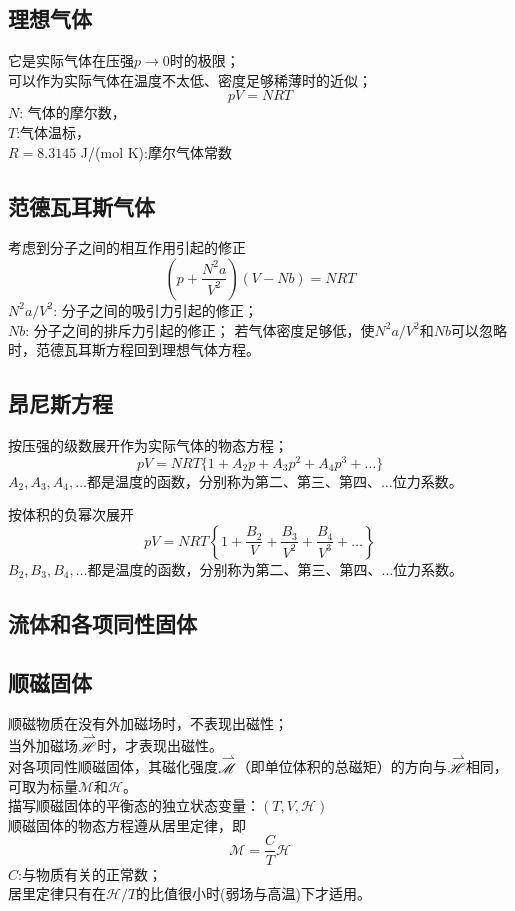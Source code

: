 \documentclass[12pt,a4paper]{article}
\newcommand{\myvec}[1]%
   {\stackrel{\raisebox{-2pt}[0pt][0pt]{\small$\rightharpoonup$}}{#1}}  %
\begin{document}
\subsection{理想气体}
它是实际气体在压强$p\rightarrow 0$时的极限；\\
可以作为实际气体在温度不太低、密度足够稀薄时的近似；
\begin{equation}
pV = NRT
\end{equation}
$N$: 气体的摩尔数，\\
$T$:气体温标，\\
$R = 8.3145$ J/(mol  K):摩尔气体常数

\subsection{范德瓦耳斯气体}
考虑到分子之间的相互作用引起的修正
\begin{equation}
\left( p+\frac{N^2 a}{V^2} \right) (V -Nb) = NRT
\end{equation}
$N^2 a/V^2$: 分子之间的吸引力引起的修正；\\
$Nb$: 分子之间的排斥力引起的修正；
若气体密度足够低，使$N^2 a/V^2$和$Nb$可以忽略时，范德瓦耳斯方程回到理想气体方程。

\subsection{昂尼斯方程}
按压强的级数展开作为实际气体的物态方程；
\begin{equation}
pV = NRT\{1 +A_2 p + A_3 p^2 +A_4 p^3 + \dots  \}
\end{equation}
$A_2, A_3, A_4, \dots$都是温度的函数，分别称为第二、第三、第四、$\dots$位力系数。

按体积的负幂次展开
\begin{equation}
pV = NRT\left \{1 +\frac{B_2}{V} + \frac{B_3}{V^2} +\frac{B_4}{V^3} + \dots \right \}
\end{equation}
$B_2, B_3, B_4, \dots$都是温度的函数，分别称为第二、第三、第四、$\dots$位力系数。

\subsection{流体和各项同性固体}


\subsection{顺磁固体}
顺磁物质在没有外加磁场时，不表现出磁性；\\
当外加磁场$\myvec{\mathscr{H}}$时，才表现出磁性。 \\
对各项同性顺磁固体，其磁化强度$\myvec{\mathscr{M}}$（即单位体积的总磁矩）的方向与$\myvec{\mathscr{H}}$相同，可取为标量$\mathscr{M}$和$\mathscr{H}$。\\
描写顺磁固体的平衡态的独立状态变量：$(T, V,  \mathscr{H})$ \\
顺磁固体的物态方程遵从居里定律，即
\begin{equation}
\mathscr{M} = \frac{C}{T} \mathscr{H}
\end{equation}
$C$:与物质有关的正常数；\\
居里定律只有在$\mathscr{H}/T$的比值很小时(弱场与高温)下才适用。

\end{document}
